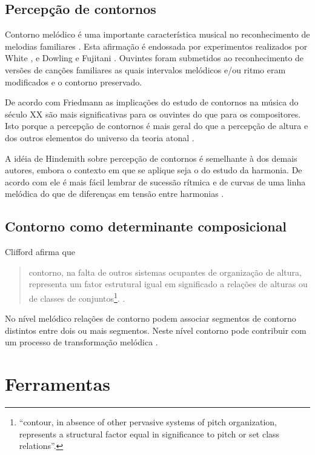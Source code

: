 \documentclass[12pt,brazil]{book}
\newcommand{\citacaoindt}[4]{
  \begin{quote}
    \normalsize
    {#2}\footnote{
      \selectlanguage{brazil}
      ``{#1}''.
    }.
    \selectlanguage{brazil}
    \cite[#3]{#4}.
  \end{quote}
}
\begin{document}
\section{Percepção de contornos}
\label{sec:perc-de-cont}

Contorno melódico é uma importante característica musical no
reconhecimento de melodias familiares
\cite[p. 136]{dowling.ea86:music}. Esta afirmação é endossada por
experimentos realizados por White \cite{white60:recognition}, e
Dowling e Fujitani \cite{dowling.ea71:contour}. Ouvintes foram
submetidos ao reconhecimento de versões de canções familiares as quais
intervalos melódicos e/ou ritmo eram modificados e o contorno
preservado.

De acordo com Friedmann as implicações do estudo de contornos na
música do século XX são mais significativas para os ouvintes do que
para os compositores. Isto porque a percepção de contornos é mais
geral do que a percepção de altura e dos outros elementos do universo
da teoria atonal \cite[p. 224]{friedmann85:methodology}.

A idéia de Hindemith sobre percepção de contornos é semelhante à dos
demais autores, embora o contexto em que se aplique seja o do estudo
da harmonia. De acordo com ele é mais fácil lembrar de sucessão
rítmica e de curvas de uma linha melódica do que de diferenças em
tensão entre harmonias \cite[p. 175]{hindemith41:craft}.

\section{Contorno como determinante composicional}
\label{sec:cont-como-determ}

Clifford afirma que

\citacaoindt{contour, in absence of other pervasive systems of pitch
  organization, represents a structural factor equal in significance
  to pitch or set class relations}{contorno, na falta de outros
  sistemas ocupantes de organização de altura, representa um fator
  estrutural igual em significado a relações de alturas ou de classes
  de conjuntos}{p. 157}{clifford95:contour}

No nível melódico relações de contorno podem associar segmentos de
contorno distintos entre dois ou mais segmentos. Neste nível contorno
pode contribuir com um processo de transformação melódica
\cite[p. 159]{clifford95:contour}.

\chapter{Ferramentas}
\label{cha:ferramentas}
\end{document}
